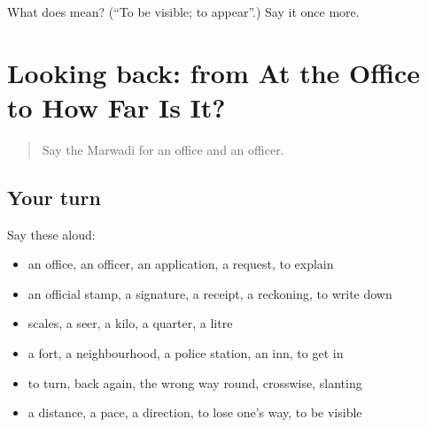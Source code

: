 \begin{tcolorbox}[breakable,colback=teal!4,colframe=teal!35!black,title={Before you move on}]
What does  mean? (\textquotedblleft{}To be visible; to appear\textquotedblright{}.) Say it once more.
\end{tcolorbox}
\section[(dialogue)]{Looking back: from At the Office to How Far Is It?}

\label{lesson:MW-R203-review-198-203}



\begin{quote}
Say the Marwadi for an office and an officer.
\end{quote}

\subsection*{Your turn}
Say these aloud:

\begin{itemize}
\raggedright
  \item an office, an officer, an application, a request, to explain
  \item an official stamp, a signature, a receipt, a reckoning, to write down
  \item scales, a seer, a kilo, a quarter, a litre
  \item a fort, a neighbourhood, a police station, an inn, to get in
  \item to turn, back again, the wrong way round, crosswise, slanting
  \item a distance, a pace, a direction, to lose one's way, to be visible
\end{itemize}

